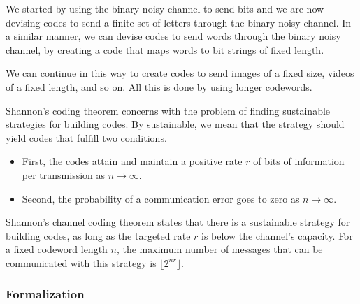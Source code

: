 We started by using the binary noisy channel to send bits and we are now devising codes to send a finite set of letters through the binary noisy channel. In a similar manner, we can devise codes to send words through the binary noisy channel, by creating a code that maps words to bit strings of fixed length. 

We can continue in this way to create codes to send images of a fixed size, videos of a fixed length, and so on. All this is done by using longer codewords. 


Shannon's coding theorem concerns with the problem of finding sustainable strategies for building codes. By sustainable, we mean that the strategy should yield codes that fulfill two conditions. 
%
\begin{itemize}
\item First, the codes attain and maintain a positive rate $r$ of bits of information per transmission as $n \to \infty$.
\item Second, the probability of a communication error goes to zero as $n \to \infty$.
\end{itemize}

Shannon's channel coding theorem states that there is a sustainable strategy for building codes, as long as the targeted rate $r$ is below the channel's capacity. For a fixed codeword length $n$, the maximum number of messages that can be communicated with this strategy is $\lfloor 2^{nr}\rfloor$.

\subsubsection*{Formalization}

